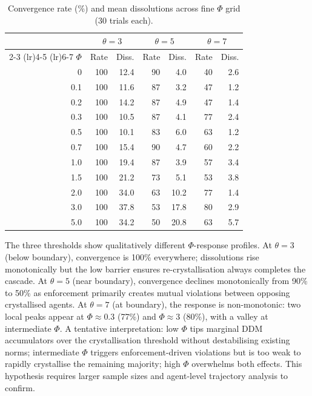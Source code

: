 \documentclass[11pt,a4paper]{article}
\begin{document}
\begin{table}[H]
\centering
\caption{Convergence rate (\%) and mean dissolutions across fine $\Phi$ grid (30 trials each).}
\label{tab:nonmonotonic}
\small
\begin{tabular}{@{}r rr rr rr@{}}
\toprule
& \multicolumn{2}{c}{$\theta = 3$} & \multicolumn{2}{c}{$\theta = 5$} & \multicolumn{2}{c}{$\theta = 7$} \\
\cmidrule(lr){2-3} \cmidrule(lr){4-5} \cmidrule(lr){6-7}
$\Phi$ & Rate & Diss. & Rate & Diss. & Rate & Diss. \\
\midrule
0   & 100 & 12.4 & 90  & 4.0  & 40  & 2.6 \\
0.1 & 100 & 11.6 & 87  & 3.2  & 47  & 1.2 \\
0.2 & 100 & 14.2 & 87  & 4.9  & 47  & 1.4 \\
0.3 & 100 & 10.5 & 87  & 4.1  & 77  & 2.4 \\
0.5 & 100 & 10.1 & 83  & 6.0  & 63  & 1.2 \\
0.7 & 100 & 15.4 & 90  & 4.7  & 60  & 2.2 \\
1.0 & 100 & 19.4 & 87  & 3.9  & 57  & 3.4 \\
1.5 & 100 & 21.2 & 73  & 5.1  & 53  & 3.8 \\
2.0 & 100 & 34.0 & 63  & 10.2 & 77  & 1.4 \\
3.0 & 100 & 37.8 & 53  & 17.8 & 80  & 2.9 \\
5.0 & 100 & 34.2 & 50  & 20.8 & 63  & 5.7 \\
\bottomrule
\end{tabular}
\end{table}

The three thresholds show qualitatively different $\Phi$-response profiles. At $\theta = 3$ (below boundary), convergence is 100\% everywhere; dissolutions rise monotonically but the low barrier ensures re-crystallisation always completes the cascade. At $\theta = 5$ (near boundary), convergence declines monotonically from 90\% to 50\% as enforcement primarily creates mutual violations between opposing crystallised agents. At $\theta = 7$ (at boundary), the response is non-monotonic: two local peaks appear at $\Phi \approx 0.3$ (77\%) and $\Phi \approx 3$ (80\%), with a valley at intermediate $\Phi$. A tentative interpretation: low $\Phi$ tips marginal DDM accumulators over the crystallisation threshold without destabilising existing norms; intermediate $\Phi$ triggers enforcement-driven violations but is too weak to rapidly crystallise the remaining majority; high $\Phi$ overwhelms both effects. This hypothesis requires larger sample sizes and agent-level trajectory analysis to confirm.
\end{document}
